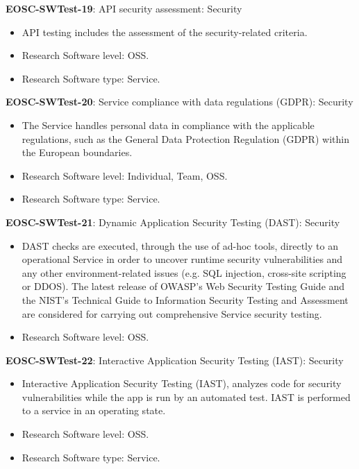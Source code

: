 \textbf{EOSC-SWTest-19}: API security assessment: Security

\begin{itemize}
    \item API testing includes the assessment of the security-related criteria. \cite{orviz_fernandez_eosc-synergy_2020}
    \item Research Software level: OSS.
    \item Research Software type: Service.
\end{itemize}

\textbf{EOSC-SWTest-20}: Service compliance with data regulations (GDPR): Security

\begin{itemize}
    \item The Service handles personal data in compliance with the applicable regulations, such as the General Data Protection Regulation (GDPR) within the European boundaries. \cite{orviz_fernandez_eosc-synergy_2020}
    \item Research Software level: Individual, Team, OSS.
    \item Research Software type: Service.
\end{itemize}

\textbf{EOSC-SWTest-21}: Dynamic Application Security Testing (DAST): Security

\begin{itemize}
    \item DAST checks are executed, through the use of ad-hoc tools, directly to an operational Service in order to uncover runtime security vulnerabilities and any other environment-related issues (e.g. SQL injection, cross-site scripting or DDOS). The latest release of OWASP's Web Security Testing Guide and the NIST's Technical Guide to Information Security Testing and Assessment are considered for carrying out comprehensive Service security testing. \cite{orviz_fernandez_eosc-synergy_2020}
    \item Research Software level: OSS.
\end{itemize}

\textbf{EOSC-SWTest-22}: Interactive Application Security Testing (IAST): Security

\begin{itemize}
    \item Interactive Application Security Testing (IAST), analyzes code for security vulnerabilities while the app is run by an automated test. IAST is performed to a service in an operating state. \cite{orviz_fernandez_eosc-synergy_2020}
    \item Research Software level: OSS.
    \item Research Software type: Service.
\end{itemize}


